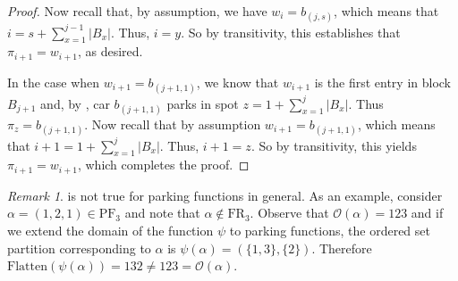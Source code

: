 \documentclass{amsart}
\newcommand{\Flatten}[0]{\mathrm{Flatten}}
\theoremstyle{definition}
\theoremstyle{definition}
\theoremstyle{remark}
\newtheorem{remark}{Remark}[section]
\newcommand{\PF}[1]{\mathrm{PF}_{#1}}
\newcommand{\FR}[1]{\mathrm{FR}_{#1}}
\newcommand{\out}{\mathcal{O}}
\begin{document}
\begin{proof}
    Now recall that, by assumption, we have $w_i=b_{(j,s)}$, which means that $i=s+\sum_{x=1}^{j-1}|B_x|$. Thus, $i=y$. 
    So by transitivity,  this establishes that 
    $\pi_{i+1}=w_{i+1}$, as desired.
    
    In the case when $w_{i+1}=b_{(j+1,1)}$, we know that $w_{i+1}$ is the first entry in block $B_{j+1}$ and, by , car $b_{(j+1,1)}$ parks in spot 
    $z=1+\sum_{x=1}^j|B_x|$.
    Thus $\pi_{z}=b_{(j+1,1)}$.
    Now recall that by assumption $w_{i+1}=b_{(j+1,1)}$, which means that $i+1=1+\sum_{x=1}^{j}|B_x|$. Thus, $i+1=z$.  
    So by transitivity, this yields 
    $\pi_{i+1}=w_{i+1}$, which completes the proof.
\end{proof}
\begin{remark}
     is not true for parking functions in general. As an example, consider $\alpha=(1,2,1)\in\PF{3}$ and note that $\alpha\notin\FR{3}$. 
    Observe that $\out(\alpha)=123$ and if we extend the domain of the function $\psi$ to parking functions, the ordered set partition corresponding to $\alpha$ is $\psi(\alpha)=(\{1,3\},\{2\})$. Therefore $\Flatten(\psi(\alpha))=132\neq123= \out(\alpha)$.
\end{remark}
\end{document}
